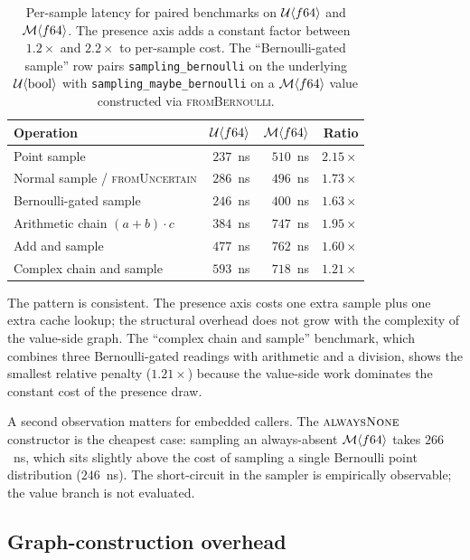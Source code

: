 \begin{table}[h]
\centering
\small
\begin{tabular}{@{}lrrr@{}}
\toprule
Operation & $\mathcal{U}\langle f64 \rangle$ & $\mathcal{M}\langle f64 \rangle$ & Ratio \\
\midrule
Point sample                       & $237$~ns & $510$~ns & $2.15\times$ \\
Normal sample / \textsc{fromUncertain} & $286$~ns & $496$~ns & $1.73\times$ \\
Bernoulli-gated sample             & $246$~ns & $400$~ns & $1.63\times$ \\
Arithmetic chain $(a+b)\cdot c$    & $384$~ns & $747$~ns & $1.95\times$ \\
Add and sample                     & $477$~ns & $762$~ns & $1.60\times$ \\
Complex chain and sample           & $593$~ns & $718$~ns & $1.21\times$ \\
\bottomrule
\end{tabular}
\caption{Per-sample latency for paired benchmarks on $\mathcal{U}\langle f64
\rangle$ and $\mathcal{M}\langle f64 \rangle$. The presence axis adds a constant
factor between $1.2\times$ and $2.2\times$ to per-sample cost. The
``Bernoulli-gated sample'' row pairs \texttt{sampling\_bernoulli} on the
underlying $\mathcal{U}\langle \mathrm{bool} \rangle$ with
\texttt{sampling\_maybe\_bernoulli} on a $\mathcal{M}\langle f64 \rangle$ value
constructed via \textsc{fromBernoulli}.}
\label{tab:sampling}
\end{table}

The pattern is consistent. The presence axis costs one extra sample plus
one extra cache lookup; the structural overhead does not grow with the
complexity of the value-side graph. The ``complex chain and sample''
benchmark, which combines three Bernoulli-gated readings with arithmetic
and a division, shows the smallest relative penalty ($1.21\times$) because
the value-side work dominates the constant cost of the presence draw.

A second observation matters for embedded callers. The
$\textsc{alwaysNone}$ constructor is the cheapest case: sampling an
always-absent $\mathcal{M}\langle f64 \rangle$ takes $266$~ns, which sits
slightly above the cost of sampling a single Bernoulli point distribution
($246$~ns). The short-circuit in the sampler is empirically observable;
the value branch is not evaluated.

\subsection{Graph-construction overhead}
\label{sec:eval:construction}

